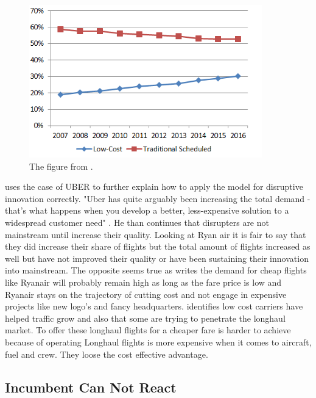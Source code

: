 \documentclass[a4paper, 11pt]{article}
\begin{document}
\begin{figure}[h!]
    \centering
    \includegraphics[width=0.9\textwidth]{evolution-lcc-vs-tradsched.png}
    \caption{The figure from \cite{Eurocontrol2017}.}
    \label{fig:graph2}
\end{figure}

\citep{Christensen2015} uses the case of UBER to further explain how to apply the model for disruptive innovation correctly. "Uber has quite arguably been increasing the total demand - that's what happens when you develop a better, less-expensive solution to a widespread customer need" \citep[p. 4]{Christensen2015}. He than continues that disrupters are not mainstream until increase their quality. Looking at Ryan air it is fair to say that they did increase their share of flights but the total amount of flights increased as well \citep{Eurocontrol2018} but have not improved their quality or have been sustaining their innovation into mainstream. The opposite seems true as \citep{Barrett} writes the demand for cheap flights like Ryanair will probably remain high as long as the fare price is low and Ryanair stays on the trajectory of cutting cost and not engage in expensive projects like new logo's and fancy headquarters. \cite{Eurocontrol2018} identifies low cost carriers have helped traffic grow and also that some are trying to penetrate the longhaul market. To offer these longhaul flights for a cheaper fare is harder to achieve because of operating Longhaul flights is more expensive when it comes to aircraft, fuel and crew. They loose the cost effective advantage.


\subsection{Incumbent Can Not React}
\label{reaction}
\end{document}
